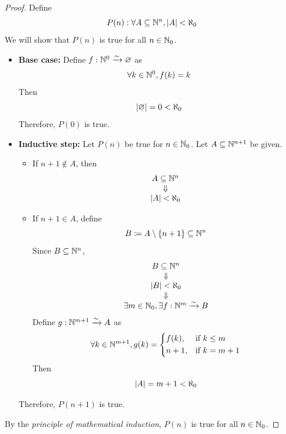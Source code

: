 \begin{proof}
    Define
    \[
    P(n): \forall A \subseteq \N^{n}, \abs*{A} < \aleph_{0}
    \]
    We will show that $P(n)$ is true for all $n \in \N_{0}$.
    \begin{itemize}
        \item \textbf{Base case:} Define $f: \N^{0} \xrightarrow{\sim} \vnot$ as
        \[
        \forall k \in \N^{0}, f(k) = k
        \]
        Then
        \[
        \abs*{\vnot} = 0 < \aleph_{0}
        \]
        Therefore, $P(0)$ is true.
        \item \textbf{Inductive step:} Let $P(n)$ be true for $n \in \N_{0}$. Let $A \subseteq \N^{n + 1}$ be given.
        \begin{itemize}
            \item If $n + 1 \notin A$, then
            \[
            \begin{array}{c}
                A \subseteq \N^{n} \\
                \Downarrow \\
                \abs*{A} < \aleph_{0} \\
            \end{array}
            \]
            \item If $n + 1 \in A$, define
            \[
            B \coloneqq A \setminus \set*{n + 1} \subseteq \N^{n}
            \]
            Since $B \subseteq \N^{n}$,
            \[
            \begin{array}{c}
                B \subseteq \N^{n} \\
                \Downarrow \\
                \abs*{B} < \aleph_{0} \\
                \Downarrow \\
                \exists m \in \N_{0}, \exists f: \N^{m} \xrightarrow{\sim} B
            \end{array}
            \]
            Define $g: \N^{m + 1} \xrightarrow{\sim} A$ as
            \[
            \forall k \in \N^{m + 1}, g(k) = \begin{dcases}
                f(k), & \text{if } k \leq m \\
                n + 1, & \text{if } k = m + 1
            \end{dcases}
            \]
            Then
            \[
            \abs*{A} = m + 1 < \aleph_{0}
            \]
        \end{itemize}
        Therefore, $P(n + 1)$ is true.
    \end{itemize}
    By the \emph{principle of mathematical induction}, $P(n)$ is true for all $n \in \N_{0}$.
\end{proof}

